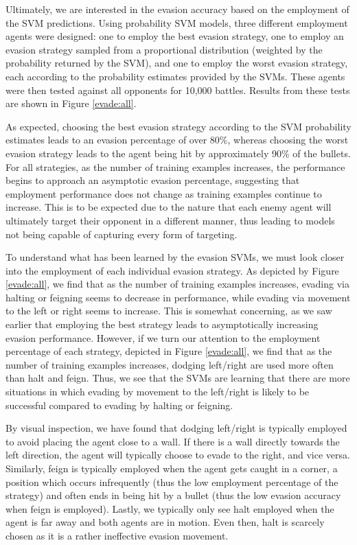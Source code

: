 \documentclass{article}
\theoremstyle{plain}
\theoremstyle{definition}
\theoremstyle{remark}
\begin{document}
Ultimately, we are interested in the evasion accuracy based on the employment of the SVM predictions. Using probability SVM models\cite{libsvm}, three different employment agents were designed: one to employ the best evasion strategy, one to employ an evasion strategy sampled from a proportional distribution (weighted by the probability returned by the SVM), and one to employ the worst evasion strategy, each according to the probability estimates provided by the SVMs. These agents were then tested against all opponents for 10,000 battles. Results from these tests are shown in Figure \ref{evade:all}.

As expected, choosing the best evasion strategy according to the SVM probability estimates leads to an evasion percentage of over 80\%, whereas choosing the worst evasion strategy leads to the agent being hit by approximately 90\% of the bullets. For all strategies, as the number of training examples increases, the performance begins to approach an asymptotic evasion percentage, suggesting that employment performance does not change as training examples continue to increase. This is to be expected due to the nature that each enemy agent will ultimately target their opponent in a different manner, thus leading to models not being capable of capturing every form of targeting.

To understand what has been learned by the evasion SVMs, we must look closer into the employment of each individual evasion strategy. As depicted by Figure \ref{evade:all}, we find that as the number of training examples increases, evading via halting or feigning seems to decrease in performance, while evading via movement to the left or right seems to increase. This is somewhat concerning, as we saw earlier that employing the best strategy leads to asymptotically increasing evasion performance. However, if we turn our attention to the employment percentage of each strategy, depicted in Figure \ref{evade:all}, we find that as the number of training examples increases, dodging left/right are used more often than halt and feign. Thus, we see that the SVMs are learning that there are more situations in which evading by movement to the left/right is likely to be successful compared to evading by halting or feigning.

By visual inspection, we have found that dodging left/right is typically employed to avoid placing the agent close to a wall. If there is a wall directly towards the left direction, the agent will typically choose to evade to the right, and vice versa. Similarly, feign is typically employed when the agent gets caught in a corner, a position which occurs infrequently (thus the low employment percentage of the strategy) and often ends in being hit by a bullet (thus the low evasion accuracy when feign is employed). Lastly, we typically only see halt employed when the agent is far away and both agents are in motion. Even then, halt is scarcely chosen as it is a rather ineffective evasion movement.
\end{document}
